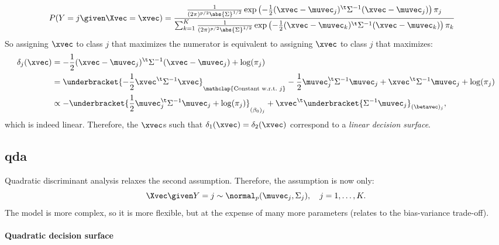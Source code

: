 \begin{equation}
    \begin{aligned}
        P(Y = j \given \Xvec = \xvec) & = \frac{
            \frac{1}{(2\pi)^{p/2} \abs{\Sigma}^{1/2}}\exp\left(-\frac{1}{2}(\xvec - \muvec_j)^\t \Sigma^{-1} (\xvec - \muvec_j)\right) \pi_j
        }{
            \sum_{k=1}^K \frac{1}{(2\pi)^{p/2} \abs{\Sigma}^{1/2}}\exp\left(-\frac{1}{2}(\xvec - \muvec_k)^\t \Sigma^{-1} (\xvec - \muvec_k)\right) \pi_k
        }
    \end{aligned}
\end{equation}
So assigning $\xvec$ to class $j$ that maximizes the numerator is equivalent to assigning $\xvec$ to class $j$ that maximizes:
\begin{equation}
    \begin{aligned}
        \delta_j(\xvec) & = -\frac{1}{2}(\xvec - \muvec_j)^\t \Sigma^{-1} (\xvec - \muvec_j) + \log(\pi_j)                                                                                 \\
                        & = \underbracket{-\frac{1}{2}\xvec^\t \Sigma^{-1} \xvec}_{\mathclap{\text{Constant w.r.t.\@ } j}} - \frac{1}{2}\muvec_j^\t \Sigma^{-1} \muvec_j + \xvec^\t \Sigma^{-1} \muvec_j + \log(\pi_j)                             \\
                        & \propto -\underbracket{\frac{1}{2}\muvec_j^\t \Sigma^{-1} \muvec_j + \log(\pi_j)}_{(\beta_0)_j} + \xvec^\t \underbracket{\Sigma^{-1} \muvec_j}_{(\betavec)_j},
    \end{aligned}
\end{equation}
which is indeed linear. Therefore, the $\xvec$s such that $\delta_1(\xvec) = \delta_2(\xvec)$ correspond to a \emph{linear decision surface}.

\subsection{\acs{qda}}

Quadratic discriminant analysis relaxes the second assumption. Therefore, the assumption is now only:
\begin{equation}
    \Xvec \given Y = j \sim \normal_p(\muvec_j, \Sigma_j),\quad j = 1, \ldots, K.
\end{equation}
The model is more complex, so it is more flexible, but at the expense of many more parameters (relates to the bias-variance trade-off).

\paragraph{Quadratic decision surface}

